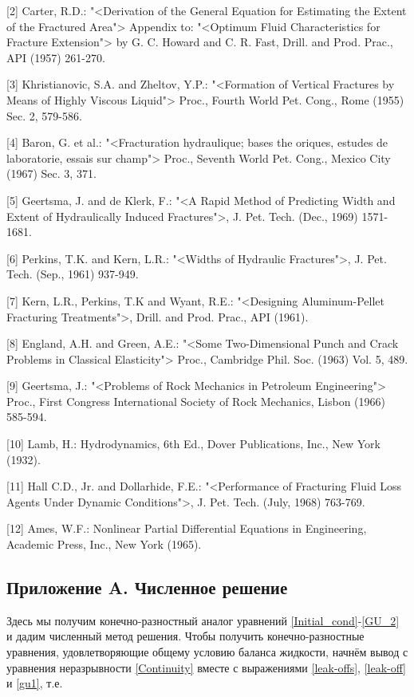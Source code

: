 \documentclass[a4paper, 11pt]{article}
\begin{document}
[2] Carter, R.D.: "<Derivation of the General Equation for Estimating the Extent of the Fractured Area"> Appendix to: "<Optimum Fluid Characteristics for Fracture Extension"> by G. C. Howard and C. R. Fast, Drill. and Prod. Prac., API (1957) 261-270.

[3] Khristianovic, S.A. and Zheltov, Y.P.: "<Formation of Vertical Fractures by Means of Highly Viscous Liquid"> Proc., Fourth World Pet. Cong., Rome (1955) Sec. 2, 579-586.

[4] Baron, G. et al.: "<Fracturation hydraulique; bases the oriques, estudes de laboratorie, essais sur champ"> Proc., Seventh World Pet. Cong., Mexico City (1967) Sec. 3, 371.

[5] Geertsma, J. and de Klerk, F.: "<A Rapid Method of Predicting Width and Extent of Hydraulically Induced Fractures">, J. Pet. Tech. (Dec., 1969) 1571-1681.

[6] Perkins, T.K. and Kern, L.R.: "<Widths of Hydraulic Fractures">, J. Pet. Tech. (Sep., 1961) 937-949.

[7] Kern, L.R., Perkins, T.K and Wyant, R.E.: "<Designing Aluminum-Pellet Fracturing Treatments">, Drill. and Prod. Prac., API (1961).

[8] England, A.H. and Green, A.E.: "<Some Two-Dimensional Punch and Crack Problems in Classical Elasticity"> Proc., Cambridge Phil. Soc. (1963) Vol. 5, 489.

[9] Geertsma, J.: "<Problems of Rock Mechanics in Petroleum Engineering"> Proc., First Congress International Society of Rock Mechanics, Lisbon (1966) 585-594.

[10] Lamb, H.: Hydrodynamics, 6th Ed., Dover Publications, Inc., New York (1932).

[11] Hall C.D., Jr. and Dollarhide, F.E.: "<Performance of Fracturing Fluid Loss Agents Under Dynamic Conditions">, J. Pet. Tech. (July, 1968) 763-769.

[12] Ames, W.F.: Nonlinear Partial Differential Equations in Engineering, Academic Press, Inc., New York (1965).

\setlength{\parindent}{20pt}

\subsection{Приложение A. Численное решение}

Здесь мы получим конечно-разностный аналог уравнений \eqref{Initial_cond}-\eqref{GU_2} и дадим численный метод решения.
Чтобы получить конечно-разностные уравнения, удовлетворяющие общему условию баланса жидкости, начнём вывод с уравнения неразрывности \eqref{Continuity} вместе с выражениями \eqref{leak-offs}, \eqref{leak-off} и \eqref{gu1}, т.е.
\end{document}
